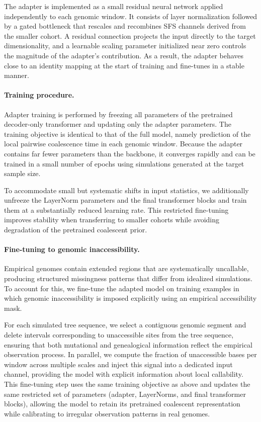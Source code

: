 \documentclass{article}
\begin{document}
{The adapter is implemented as a small residual neural network applied independently
to each genomic window.
It consists of layer normalization followed by a gated bottleneck that rescales and
recombines SFS channels derived from the smaller cohort.
A residual connection projects the input directly to the target dimensionality, and
a learnable scaling parameter initialized near zero controls the magnitude of the
adapter’s contribution.
As a result, the adapter behaves close to an identity mapping at the start of
training and fine-tunes in a stable manner.

\paragraph{Training procedure.}
Adapter training is performed by freezing all parameters of the pretrained
decoder-only transformer and updating only the adapter parameters.
The training objective is identical to that of the full model, namely prediction of
the local pairwise coalescence time in each genomic window.
Because the adapter contains far fewer parameters than the backbone, it converges
rapidly and can be trained in a small number of epochs using simulations generated
at the target sample size.

To accommodate small but systematic shifts in input statistics, we additionally
unfreeze the LayerNorm parameters and the final transformer blocks and train them at
a substantially reduced learning rate.
This restricted fine-tuning improves stability when transferring to smaller cohorts
while avoiding degradation of the pretrained coalescent prior.

\paragraph{Fine-tuning to genomic inaccessibility.}
Empirical genomes contain extended regions that are systematically uncallable,
producing structured missingness patterns that differ from idealized simulations.
To account for this, we fine-tune the adapted model on training examples in which
genomic inaccessibility is imposed explicitly using an empirical accessibility mask.

For each simulated tree sequence, we select a contiguous genomic segment and delete
intervals corresponding to unaccessible sites from the tree sequence, ensuring that
both mutational and genealogical information reflect the empirical observation
process.
In parallel, we compute the fraction of unaccessible bases per window across multiple
scales and inject this signal into a dedicated input channel, providing the model
with explicit information about local callability.
This fine-tuning step uses the same training objective as above and updates the same
restricted set of parameters (adapter, LayerNorms, and final transformer blocks),
allowing the model to retain its pretrained coalescent representation while
calibrating to irregular observation patterns in real genomes.


}
\end{document}
